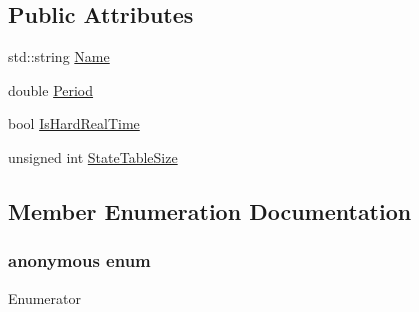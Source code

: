 \subsection*{Public Attributes}
\begin{DoxyCompactItemize}
\item 
std\-::string \hyperlink{classmts_task_periodic_constructor_arg_a2d6bafc9b8014ea8972324df1325fe28}{Name}
\item 
double \hyperlink{classmts_task_periodic_constructor_arg_aa83e6ea04bc9432451c8b9ba9001e629}{Period}
\item 
bool \hyperlink{classmts_task_periodic_constructor_arg_a584cbd7f13e57c11978c9264e78aac46}{Is\-Hard\-Real\-Time}
\item 
unsigned int \hyperlink{classmts_task_periodic_constructor_arg_a63da643cce33a5cb0e262e4cb391c0a6}{State\-Table\-Size}
\end{DoxyCompactItemize}


\subsection{Member Enumeration Documentation}
\hypertarget{classmts_task_periodic_constructor_arg_a9c81cd0ff169c6afedc5cf3e69f181a9}{\subsubsection[{anonymous enum}]{\setlength{\rightskip}{0pt plus 5cm}anonymous enum}}\label{classmts_task_periodic_constructor_arg_a9c81cd0ff169c6afedc5cf3e69f181a9}
\begin{Desc}
\item[Enumerator]\par
\begin{description}
\item[{\em 
\hypertarget{classmts_task_periodic_constructor_arg_a9c81cd0ff169c6afedc5cf3e69f181a9a636d05314de683eba7b7c31f0627f5cb}{S\-T\-A\-T\-E\-\_\-\-T\-A\-B\-L\-E\-\_\-\-D\-E\-F\-A\-U\-L\-T\-\_\-\-S\-I\-Z\-E}\label{classmts_task_periodic_constructor_arg_a9c81cd0ff169c6afedc5cf3e69f181a9a636d05314de683eba7b7c31f0627f5cb}
}]\end{description}
\end{Desc}


